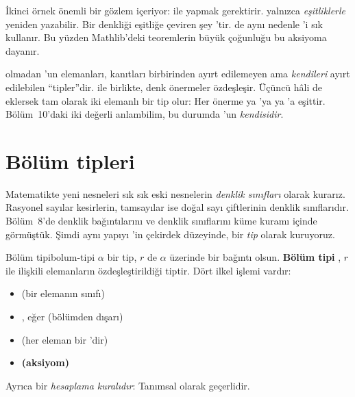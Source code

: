 \noindent İkinci örnek önemli bir gözlem içeriyor:  ile
 yapmak  gerektirir.  yalnızca
\emph{eşitliklerle} yeniden yazabilir. Bir denkliği eşitliğe çeviren şey
'tir.  de aynı nedenle 'i sık
kullanır. Bu yüzden Mathlib'deki teoremlerin büyük çoğunluğu bu aksiyoma
dayanır.

\begin{onemlifikir}
 olmadan 'un elemanları, kanıtları birbirinden ayırt
edilemeyen ama \emph{kendileri} ayırt edilebilen ``tipler''dir.
 ile birlikte, denk önermeler özdeşleşir. Üçüncü hâli de
eklersek  tam olarak iki elemanlı bir tip olur: Her önerme ya
'ya ya 'a eşittir. Bölüm~10'daki iki değerli anlambilim,
bu durumda 'un \emph{kendisidir}.
\end{onemlifikir}


\section{Bölüm tipleri}\label{sec:bolum-tipleri}

Matematikte yeni nesneleri sık sık eski nesnelerin \emph{denklik
sınıfları} olarak kurarız. Rasyonel sayılar kesirlerin, tamsayılar ise
doğal sayı çiftlerinin denklik sınıflarıdır. Bölüm~8'de denklik bağıntılarını
ve denklik sınıflarını küme kuramı içinde görmüştük. Şimdi aynı yapıyı
\Lean{}'in çekirdek düzeyinde, bir \emph{tip} olarak kuruyoruz.

\begin{tanim}{Bölüm tipi}{bolum-tipi}
$\alpha$ bir tip, $r$ de $\alpha$ üzerinde bir bağıntı olsun. \textbf{Bölüm
tipi} , $r$ ile ilişkili elemanların özdeşleştirildiği tiptir.
Dört ilkel işlemi vardır:
\begin{itemize}
  \item {} \hfill (bir elemanın sınıfı)
  \item {}, eğer  \hfill (bölümden dışarı)
  \item {} \hfill (her eleman bir 'dir)
  \item {} \hfill \textcolor{teoremframe}{\textbf{(aksiyom)}}
\end{itemize}
Ayrıca  bir \emph{hesaplama
kuralıdır}: Tanımsal olarak geçerlidir.
\end{tanim}


